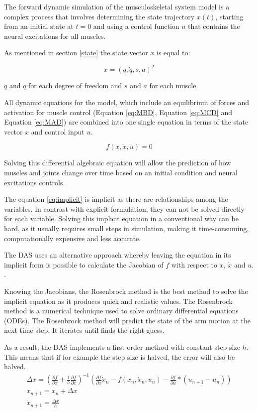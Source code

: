 The forward dynamic simulation of the musculoskeletal system model is a complex process that involves determining the state trajectory $x(t)$, starting from an initial state at $t = 0$ and using a control function $u$ that contains the neural excitations for all muscles. 

As mentioned in section \ref{state} the state vector $x$ is equal to:

\begin{equation}
    x = (q,\dot{q},s,a)^T
\end{equation}

$q$ and $\dot{q}$ for each degree of freedom and $s$ and $a$ for each muscle.

All dynamic equations for the model, which include an equilibrium of forces and activation for muscle control (Equation \ref{eq:MBD}, Equation \ref{eq:MCD} and Equation \ref{eq:MAD}) are combined into one single equation in terms of the state vector $x$ and control input $u$.

\begin{equation} \label{eq:implicit}
    f(x,\dot{x},u)=0
\end{equation}

Solving this differential algebraic equation will allow the prediction of how muscles and joints change over time based on an initial condition and neural excitations controls.

The equation \ref{eq:implicit} is implicit as there are relationships among the variables. In contrast with explicit formulation, they can not be solved directly for each variable. Solving this implicit equation in a conventional way can be hard, as it usually requires small steps in simulation, making it time-consuming, computationally expensive and less accurate.

The \ac{DAS} uses an alternative approach whereby leaving the equation in its implicit form is possible to calculate the Jacobian of $f$ with respect to $x$, $\dot{x}$ and $u$. \cite{IMP}.

Knowing the Jacobians, the Rosenbrock method is the best method to solve the implicit equation as it produces quick and realistic values. The Rosenbrock method is a numerical technique used to solve ordinary differential equations (ODEs). The Rosenbrock method will predict the state of the arm motion at the next time step. It iterates until finds the right guess.

As a result, the \ac{DAS} implements a first-order method with constant step size $h$. This means that if for example the step size is halved, the error will also be halved. 
\begin{equation} \label{eq:rosenbrock}
 \begin{aligned}
    \Delta x = (\frac{\partial f}{\partial x} + \frac{1}{h}\frac{\partial f}
    {\partial \dot{x}})^{-1}(\frac{\partial f}{\partial \dot{x}}\dot{x}_n - f(x_n, \dot{x}_n, u_n) - \frac{\partial f}{\partial u}*(u_{n+1} - u_{n}))\\
    x_{n+1} = x_n + \Delta{x} \\
    \dot{x}_{n+1} = \frac{\Delta{x}}{h}
\end{aligned}
\end{equation} \newpage

